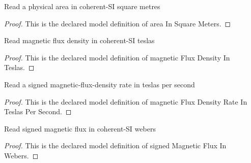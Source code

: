 \begin{definition}
  \label{def:physics:phyx-mini-0936:phyxminiproblems-problemphyxmini0936-areainsquaremeters}
  Read a physical area in coherent-SI square metres
\end{definition}
\begin{proof}
  This is the declared model definition of area In Square Meters.
\end{proof}
\begin{definition}
  \label{def:physics:phyx-mini-0936:phyxminiproblems-problemphyxmini0936-magneticfluxdensityinteslas}
  Read magnetic flux density in coherent-SI teslas
\end{definition}
\begin{proof}
  This is the declared model definition of magnetic Flux Density In Teslas.
\end{proof}
\begin{definition}
  \label{def:physics:phyx-mini-0936:phyxminiproblems-problemphyxmini0936-magneticfluxdensityrateinteslaspersecond}
  Read a signed magnetic-flux-density rate in teslas per second
\end{definition}
\begin{proof}
  This is the declared model definition of magnetic Flux Density Rate In Teslas Per Second.
\end{proof}
\begin{definition}
  \label{def:physics:phyx-mini-0936:phyxminiproblems-problemphyxmini0936-signedmagneticfluxinwebers}
  Read signed magnetic flux in coherent-SI webers
\end{definition}
\begin{proof}
  This is the declared model definition of signed Magnetic Flux In Webers.
\end{proof}
